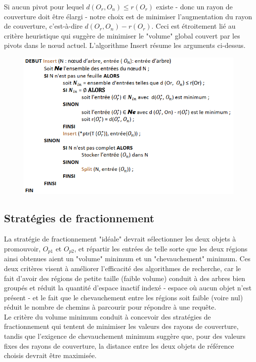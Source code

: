 Si aucun pivot pour lequel $ d(O_r, O_n) \le r(O_r) $ existe - donc un rayon de couverture doit être élargi - notre choix est de minimiser l'augmentation du rayon de couverture, c'est-à-dire $ d(O_r, O_n)-r(O_r) $. Ceci est étroitement lié au critère heuristique qui suggère de minimiser le "volume" global couvert par les pivots dans le nœud actuel. L'algorithme Insert résume les arguments ci-dessus.
\begin{figure}[H]
	\centering
	\includegraphics[width=.9 \textwidth]{Figures/insert.png} %
\end{figure} 


\subsection{Stratégies de fractionnement}
La stratégie de fractionnement "idéale" devrait sélectionner les deux objets à promouvoir, $ O_{p1} $ et $ O_{p2} $, et répartir les entrées de telle sorte que les deux régions ainsi obtenues aient un "volume" minimum et un "chevauchement" minimum. Ces deux critères visent à améliorer l'efficacité des algorithmes de recherche, car le fait d'avoir des régions de petite taille (faible volume) conduit à des arbres bien groupés et réduit la quantité d'espace inactif indexé - espace où aucun objet n'est présent - et le fait que le chevauchement entre les régions soit faible (voire nul) réduit le nombre de chemins à parcourir pour répondre à une requête.\\

Le critère du volume minimum conduit à concevoir des stratégies de fractionnement qui tentent de minimiser les valeurs des rayons de couverture, tandis que l'exigence de chevauchement minimum suggère que, pour des valeurs fixes des rayons de couverture, la distance entre les deux objets de référence choisis devrait être maximisée.

